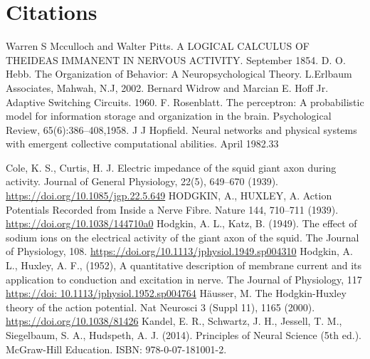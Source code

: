 \documentclass[12pt,a4paper]{report}
\begin{document}
\chapter{Citations}

\begin{thebibliography}{9}
     Warren S Mcculloch and Walter Pitts. A LOGICAL CALCULUS OF THEIDEAS IMMANENT IN NERVOUS ACTIVITY. September 1854.
     D. O. Hebb. The Organization of Behavior: A Neuropsychological Theory. L.Erlbaum Associates, Mahwah, N.J, 2002.
     Bernard Widrow and Marcian E. Hoff Jr. Adaptive Switching Circuits. 1960.
     F. Rosenblatt. The perceptron: A probabilistic model for information storage and organization in the brain. Psychological Review, 65(6):386–408,1958.
     J J Hopfield. Neural networks and physical systems with emergent collective computational abilities. April 1982.33
    
     Cole, K. S., Curtis, H. J. Electric impedance of the squid giant axon during activity. Journal of General Physiology, 22(5), 649–670 (1939). 
    \url{https://doi.org/10.1085/jgp.22.5.649}
    HODGKIN, A., HUXLEY, A. Action Potentials Recorded from Inside a Nerve Fibre. Nature 144, 710–711 (1939).
    \url{https://doi.org/10.1038/144710a0}
     Hodgkin, A. L., Katz, B. (1949). The effect of sodium ions on the electrical activity of the giant axon of the squid. The Journal of Physiology, 108. 
    \url{https://doi.org/10.1113/jphysiol.1949.sp004310}
     Hodgkin, A. L., Huxley, A. F., (1952), A quantitative description of membrane current and its application to conduction and excitation in nerve. The Journal of Physiology, 117 
    \url{https://doi: 10.1113/jphysiol.1952.sp004764}
     Häusser, M. The Hodgkin-Huxley theory of the action potential. Nat Neurosci 3 (Suppl 11), 1165 (2000). \url{https://doi.org/10.1038/81426}
    Kandel, E. R., Schwartz, J. H., Jessell, T. M., Siegelbaum, S. A., Hudspeth, A. J. (2014). Principles of Neural Science (5th ed.). McGraw-Hill Education. ISBN: 978-0-07-181001-2.



\end{thebibliography}
\end{document}
